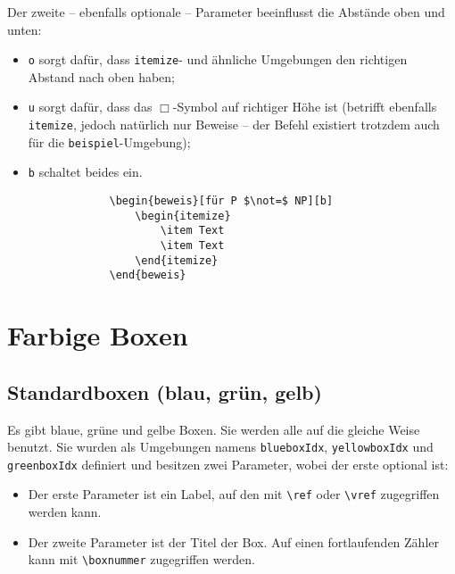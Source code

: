 			\vspace*{.5em}
			Der zweite -- ebenfalls optionale -- Parameter beeinflusst die Abstände oben und unten:
			\begin{itemize}
				\item \texttt o sorgt dafür, dass \texttt{itemize}- und ähnliche Umgebungen den richtigen Abstand nach oben haben;
				\item \texttt u sorgt dafür, dass das $\Box$-Symbol auf richtiger Höhe ist (betrifft ebenfalls \texttt{itemize}, jedoch natürlich nur Beweise -- der Befehl existiert trotzdem auch für die \texttt{beispiel}-Umgebung);
				\item \texttt b schaltet beides ein.
			\end{itemize}
			
			\newpage
			
			\begin{verbatim}
				\begin{beweis}[für P $\not=$ NP][b]
				    \begin{itemize} 
				        \item Text 
				        \item Text 
				    \end{itemize}
				\end{beweis}
			\end{verbatim}
			
			
	\chapter{Farbige Boxen}
		\section{Standardboxen (blau, grün, gelb)}
			Es gibt blaue, grüne und gelbe Boxen. Sie werden alle auf die gleiche Weise benutzt. Sie wurden als Umgebungen namens \verb|blueboxIdx|, \verb|yellowboxIdx| und \verb|greenboxIdx| definiert und besitzen zwei Parameter, wobei der erste optional ist:
			\begin{itemize}
				\item Der erste Parameter ist ein Label, auf den mit \verb|\ref| oder \verb|\vref| zugegriffen werden kann.
				\item Der zweite Parameter ist der Titel der Box. Auf einen fortlaufenden Zähler kann mit \verb|\boxnummer| zugegriffen werden.
			\end{itemize}
			 
